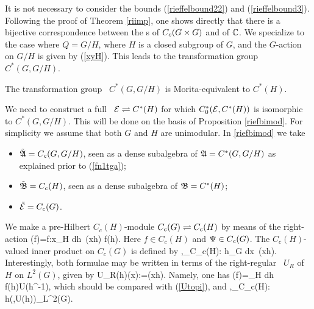 It is not necessary to consider the bounds (\ref{rieffelbound22})
and (\ref{rieffelbound3}). Following the proof of Theorem \ref{riimp},
one  shows directly that there is a bijective correspondence between the
\rep s of $C_c(G\times G)$ and of ${\Bbb C}$.
\enp
{}
We specialize to the case where $Q=G/H$, where $H$ is a closed subgroup of $G$,
and the $G$-action on $G/H$ is given by (\ref{xyH}). This leads to the
transformation group \ca\ $C^*(G,G/H)$. 
\begin{Theorem}
The transformation group \ca\ $C^*(G,G/H)$ is Morita-equivalent to $C^*(H)$.
\end{Theorem}

We need to construct a full \HCM\ ${\cal E}\rightleftharpoons C^*(H)$ for which
$C^*_0({\cal E},C^*(H))$ is isomorphic to $C^*(G,G/H)$. 
This will be done  on the basis of Proposition \ref{riefbimod}.
For simplicity we assume that both $G$ and $H$ are unimodular.
In \ref{riefbimod} we take 
\begin{itemize}
\item
$\tilde{{\frak A}}=C_c(G,G/H)$, seen as a dense
subalgebra of ${\frak A}=C^*(G,G/H)$ as explained prior to (\ref{fn1tga});
\item
$\tilde{{\frak B}}=C_c(H)$, seen as a dense
subalgebra of ${\frak B}=C^*(H)$;
\item
$\tilde{{\cal E}}=C_c(G)$.
\end{itemize}

We make a pre-Hilbert $C_c(H)$-module $C_c(G)\rightleftharpoons C_c(H)$ by means of
the right-action
\be
\pir(f)\Ps=\Ps f:x\raw \int_H dh\, \Ps(xh\inv) f(h). 
\ee
Here $f\in C_c(H)$ and $\Psi\in C_c(G)$. The $C_c(H)$-valued
inner product on $C_c(G)$ is defined by
\be 
\la\Ps,\Ph\ra_{C_c(H)}: h\raw \int_G dx\, \Ph(xh).
\ee
Interestingly, both formulae may be written in terms of the right-regular
\rep\ $U_R$ of $H$ on $L^2(G)$, given by
\be
U_R(h)\Ps(x):=\Ps(xh). 
\ee
Namely, one has 
\be
\pir(f)=\int_H dh\, f(h)U(h^{-1}), 
\ee
which should be compared with (\ref{Utopi}), and
\be
\la \Ps,\Ph\ra_{C_c(H)}:\, h\raw (\Ps,U(h)\Ph)_{L^2(G)}. 
\ee

